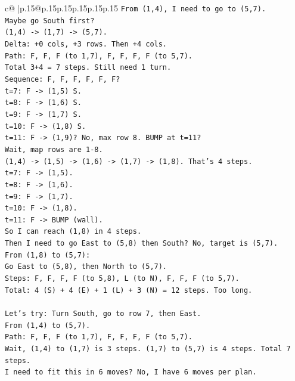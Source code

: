 \documentclass{article}
\begin{document}
{\begin{supertabular}{c@{$\;$}|p{.15\linewidth}@{}p{.15\linewidth}p{.15\linewidth}p{.15\linewidth}p{.15\linewidth}p{.15\linewidth}}
{{{\texttt{From (1,4), I need to go to (5,7).} \\
\texttt{Maybe go South first?} \\
\texttt{(1,4) {-}> (1,7) {-}> (5,7).} \\
\texttt{Delta: +0 cols, +3 rows. Then +4 cols.} \\
\texttt{Path: F, F, F (to 1,7), F, F, F, F (to 5,7).} \\
\texttt{Total 3+4 = 7 steps. Still need 1 turn.} \\
\texttt{Sequence: F, F, F, F, F, F?} \\
\texttt{t=7: F {-}> (1,5) S.} \\
\texttt{t=8: F {-}> (1,6) S.} \\
\texttt{t=9: F {-}> (1,7) S.} \\
\texttt{t=10: F {-}> (1,8) S.} \\
\texttt{t=11: F {-}> (1,9)? No, max row 8. BUMP at t=11?} \\
\texttt{Wait, map rows are 1{-}8.} \\
\texttt{(1,4) {-}> (1,5) {-}> (1,6) {-}> (1,7) {-}> (1,8). That's 4 steps.} \\
\texttt{t=7: F {-}> (1,5).} \\
\texttt{t=8: F {-}> (1,6).} \\
\texttt{t=9: F {-}> (1,7).} \\
\texttt{t=10: F {-}> (1,8).} \\
\texttt{t=11: F {-}> BUMP (wall).} \\
\texttt{So I can reach (1,8) in 4 steps.} \\
\texttt{Then I need to go East to (5,8) then South? No, target is (5,7).} \\
\texttt{From (1,8) to (5,7):} \\
\texttt{Go East to (5,8), then North to (5,7).} \\
\texttt{Steps: F, F, F, F (to 5,8), L (to N), F, F, F (to 5,7).} \\
\texttt{Total: 4 (S) + 4 (E) + 1 (L) + 3 (N) = 12 steps. Too long.} \\
\\ 
\texttt{Let's try: Turn South, go to row 7, then East.} \\
\texttt{From (1,4) to (5,7).} \\
\texttt{Path: F, F, F (to 1,7), F, F, F, F (to 5,7).} \\
\texttt{Wait, (1,4) to (1,7) is 3 steps. (1,7) to (5,7) is 4 steps. Total 7 steps.} \\
\texttt{I need to fit this in 6 moves? No, I have 6 moves per plan.} \\
}}}
\end{supertabular}}
\end{document}
